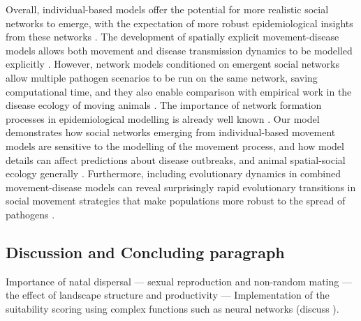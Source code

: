 Overall, individual-based models offer the potential for more realistic social networks to emerge, with the expectation of more robust epidemiological insights from these networks \citep[][]{lunn2021}.
The development of spatially explicit movement-disease models allows both movement and disease transmission dynamics to be modelled explicitly \citep{white2018b,white2018,scherer2020,gupte2022c}.
However, network models conditioned on emergent social networks allow multiple pathogen scenarios to be run on the same network, saving computational time, and they also enable comparison with empirical work in the disease ecology of moving animals \citep{wilber2022}.
The importance of network formation processes in epidemiological modelling is already well known \citep[][]{white2017,wilber2022}.
Our model demonstrates how social networks emerging from individual-based movement models are sensitive to the modelling of the movement process, and how model details can affect predictions about disease outbreaks, and animal spatial-social ecology generally \citep{webber2018,webber2022}.
Furthermore, including evolutionary dynamics in combined movement-disease models can reveal surprisingly rapid evolutionary transitions in social movement strategies that make populations more robust to the spread of pathogens \citep{gupte2022c}.

\subsection*{Discussion and Concluding paragraph}

Importance of natal dispersal --- sexual reproduction and non-random mating --- the effect of landscape structure and productivity --- Implementation of the suitability scoring using complex functions such as neural networks (discuss \cite{mueller2011,deangelis2019}).







